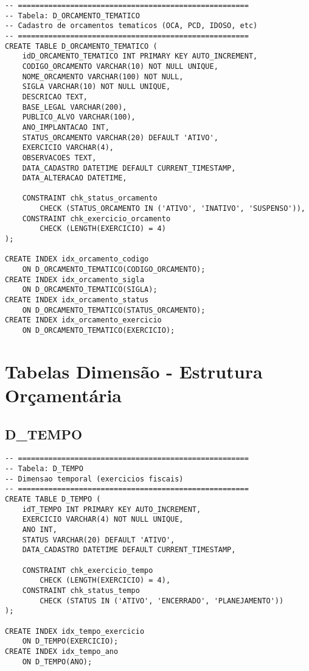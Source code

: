 \documentclass[12pt,a4paper]{article}
\begin{document}
\begin{lstlisting}
-- =====================================================
-- Tabela: D_ORCAMENTO_TEMATICO
-- Cadastro de orcamentos tematicos (OCA, PCD, IDOSO, etc)
-- =====================================================
CREATE TABLE D_ORCAMENTO_TEMATICO (
    idD_ORCAMENTO_TEMATICO INT PRIMARY KEY AUTO_INCREMENT,
    CODIGO_ORCAMENTO VARCHAR(10) NOT NULL UNIQUE,
    NOME_ORCAMENTO VARCHAR(100) NOT NULL,
    SIGLA VARCHAR(10) NOT NULL UNIQUE,
    DESCRICAO TEXT,
    BASE_LEGAL VARCHAR(200),
    PUBLICO_ALVO VARCHAR(100),
    ANO_IMPLANTACAO INT,
    STATUS_ORCAMENTO VARCHAR(20) DEFAULT 'ATIVO',
    EXERCICIO VARCHAR(4),
    OBSERVACOES TEXT,
    DATA_CADASTRO DATETIME DEFAULT CURRENT_TIMESTAMP,
    DATA_ALTERACAO DATETIME,
    
    CONSTRAINT chk_status_orcamento 
        CHECK (STATUS_ORCAMENTO IN ('ATIVO', 'INATIVO', 'SUSPENSO')),
    CONSTRAINT chk_exercicio_orcamento 
        CHECK (LENGTH(EXERCICIO) = 4)
);

CREATE INDEX idx_orcamento_codigo 
    ON D_ORCAMENTO_TEMATICO(CODIGO_ORCAMENTO);
CREATE INDEX idx_orcamento_sigla 
    ON D_ORCAMENTO_TEMATICO(SIGLA);
CREATE INDEX idx_orcamento_status 
    ON D_ORCAMENTO_TEMATICO(STATUS_ORCAMENTO);
CREATE INDEX idx_orcamento_exercicio 
    ON D_ORCAMENTO_TEMATICO(EXERCICIO);
\end{lstlisting}

\section{Tabelas Dimensão - Estrutura Orçamentária}

\subsection{D\_TEMPO}

\begin{lstlisting}
-- =====================================================
-- Tabela: D_TEMPO
-- Dimensao temporal (exercicios fiscais)
-- =====================================================
CREATE TABLE D_TEMPO (
    idT_TEMPO INT PRIMARY KEY AUTO_INCREMENT,
    EXERCICIO VARCHAR(4) NOT NULL UNIQUE,
    ANO INT,
    STATUS VARCHAR(20) DEFAULT 'ATIVO',
    DATA_CADASTRO DATETIME DEFAULT CURRENT_TIMESTAMP,
    
    CONSTRAINT chk_exercicio_tempo 
        CHECK (LENGTH(EXERCICIO) = 4),
    CONSTRAINT chk_status_tempo 
        CHECK (STATUS IN ('ATIVO', 'ENCERRADO', 'PLANEJAMENTO'))
);

CREATE INDEX idx_tempo_exercicio 
    ON D_TEMPO(EXERCICIO);
CREATE INDEX idx_tempo_ano 
    ON D_TEMPO(ANO);
\end{lstlisting}
\end{document}
